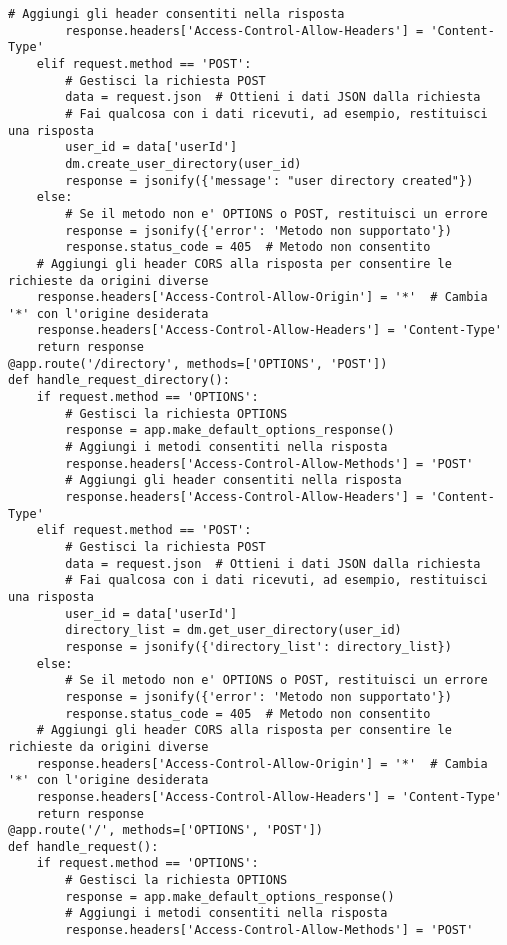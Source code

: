 \begin{lstlisting}[style=pythonstyle,caption={Codice del server.py}, label={lst:server}]
        # Aggiungi gli header consentiti nella risposta
        response.headers['Access-Control-Allow-Headers'] = 'Content-Type'
    elif request.method == 'POST':
        # Gestisci la richiesta POST
        data = request.json  # Ottieni i dati JSON dalla richiesta
        # Fai qualcosa con i dati ricevuti, ad esempio, restituisci una risposta
        user_id = data['userId']
        dm.create_user_directory(user_id)
        response = jsonify({'message': "user directory created"})
    else:
        # Se il metodo non e' OPTIONS o POST, restituisci un errore
        response = jsonify({'error': 'Metodo non supportato'})
        response.status_code = 405  # Metodo non consentito
    # Aggiungi gli header CORS alla risposta per consentire le richieste da origini diverse
    response.headers['Access-Control-Allow-Origin'] = '*'  # Cambia '*' con l'origine desiderata
    response.headers['Access-Control-Allow-Headers'] = 'Content-Type'
    return response
@app.route('/directory', methods=['OPTIONS', 'POST'])
def handle_request_directory():
    if request.method == 'OPTIONS':
        # Gestisci la richiesta OPTIONS
        response = app.make_default_options_response()
        # Aggiungi i metodi consentiti nella risposta
        response.headers['Access-Control-Allow-Methods'] = 'POST'
        # Aggiungi gli header consentiti nella risposta
        response.headers['Access-Control-Allow-Headers'] = 'Content-Type'
    elif request.method == 'POST':
        # Gestisci la richiesta POST
        data = request.json  # Ottieni i dati JSON dalla richiesta
        # Fai qualcosa con i dati ricevuti, ad esempio, restituisci una risposta
        user_id = data['userId']
        directory_list = dm.get_user_directory(user_id)
        response = jsonify({'directory_list': directory_list})
    else:
        # Se il metodo non e' OPTIONS o POST, restituisci un errore
        response = jsonify({'error': 'Metodo non supportato'})
        response.status_code = 405  # Metodo non consentito
    # Aggiungi gli header CORS alla risposta per consentire le richieste da origini diverse
    response.headers['Access-Control-Allow-Origin'] = '*'  # Cambia '*' con l'origine desiderata
    response.headers['Access-Control-Allow-Headers'] = 'Content-Type'
    return response
@app.route('/', methods=['OPTIONS', 'POST'])
def handle_request():
    if request.method == 'OPTIONS':
        # Gestisci la richiesta OPTIONS
        response = app.make_default_options_response()
        # Aggiungi i metodi consentiti nella risposta
        response.headers['Access-Control-Allow-Methods'] = 'POST'

\end{lstlisting}
